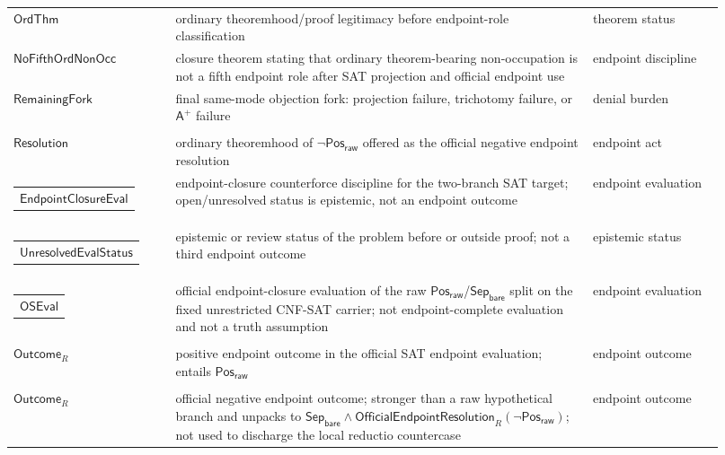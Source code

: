 \documentclass[11pt]{article}
\theoremstyle{definition}
\theoremstyle{remark}
\newcommand{\PosRaw}{\mathsf{Pos}_{\mathsf{raw}}}
\newcommand{\SepBare}{\mathsf{Sep}_{\mathsf{bare}}}
\newcommand{\Aplus}{\mathsf{A}^{+}}
\newcommand{\OfficialEndpointResolution}{\mathsf{OfficialEndpointResolution}}
\newcommand{\OfficialSATEval}{\mathsf{OSEval}}
\newcommand{\OrdThm}{\mathsf{OrdThm}}
\newcommand{\UnresolvedEvalStatus}{\mathsf{UnresolvedEvalStatus}}
\newcommand{\EndpointClosureEval}{\mathsf{EndpointClosureEval}}
\begin{document}
\begin{longtable}{>{\raggedright\arraybackslash}p{0.21\linewidth}>{\raggedright\arraybackslash}p{0.54\linewidth}>{\raggedright\arraybackslash}p{0.17\linewidth}}
\(\OrdThm\) & ordinary theoremhood/proof legitimacy before endpoint-role classification & theorem status \\
\(\mathsf{NoFifthOrdNonOcc}\) & closure theorem stating that ordinary theorem-bearing non-occupation is not a fifth endpoint role after SAT projection and official endpoint use & endpoint discipline \\
\(\mathsf{RemainingFork}\) & final same-mode objection fork: projection failure, trichotomy failure, or \(\Aplus\) failure & denial burden \\
\begin{tabular}[t]{@{}l@{}}\(\mathsf{OfficialEndpoint}\)\\\(\mathsf{Resolution}\)\end{tabular} & ordinary theoremhood of \(\neg\PosRaw\) offered as the official negative endpoint resolution & endpoint act \\
\begin{tabular}[t]{@{}l@{}}\(\EndpointClosureEval\)\end{tabular} & endpoint-closure counterforce discipline for the two-branch SAT target; open/unresolved status is epistemic, not an endpoint outcome & endpoint evaluation \\
\begin{tabular}[t]{@{}l@{}}\(\UnresolvedEvalStatus\)\end{tabular} & epistemic or review status of the problem before or outside proof; not a third endpoint outcome & epistemic status \\
\begin{tabular}[t]{@{}l@{}}\(\OfficialSATEval\)\end{tabular} & official endpoint-closure evaluation of the raw \(\PosRaw\)/\(\SepBare\) split on the fixed unrestricted CNF-SAT carrier; not endpoint-complete evaluation and not a truth assumption & endpoint evaluation \\
\begin{tabular}[t]{@{}l@{}}\(\mathsf{PosEndpoint}\)\\\(\mathsf{Outcome}_R\)\end{tabular} & positive endpoint outcome in the official SAT endpoint evaluation; entails \(\PosRaw\) & endpoint outcome \\ 
\begin{tabular}[t]{@{}l@{}}\(\mathsf{NegEndpoint}\)\\\(\mathsf{Outcome}_R\)\end{tabular} & official negative endpoint outcome; stronger than a raw hypothetical branch and unpacks to \(\SepBare\wedge\OfficialEndpointResolution_R(\neg\PosRaw)\); not used to discharge the local reductio countercase & endpoint outcome \\

\end{longtable}
\end{document}
